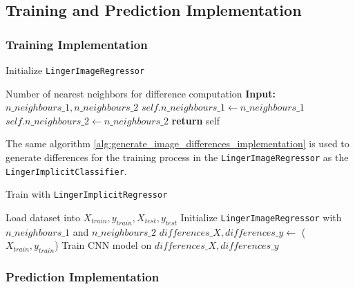 \documentclass[a4paper, 12pt]{report}
\begin{document}
\subsection{Training and Prediction Implementation}
\subsubsection{Training Implementation}
\begin{algorithm}
    \caption{Initialize \texttt{LingerImageRegressor}}
    \label{alg:initialize_regressor}
    \begin{algorithmic}[1]
    \State Number of nearest neighbors for difference computation
    \State \textbf{Input:} $n\_neighbours\_1, n\_neighbours\_2$ 
        \State $self.n\_neighbours\_1 \gets n\_neighbours\_1$
        \State $self.n\_neighbours\_2 \gets n\_neighbours\_2$
        \State \textbf{return} self
    \EndProcedure
    \end{algorithmic}
\end{algorithm}

The same algorithm \ref{alg:generate_image_differences_implementation} is used to generate differences for the training process in the \texttt{LingerImageRegressor} 
as the \texttt{LingerImplicitClassifier}.

\begin{algorithm}
    \caption{Train with \texttt{LingerImplicitRegressor}}
    \label{alg:train_image_reg_train_implementation}
    \begin{algorithmic}[1]
        \State Load dataset into $X_{train}, y_{train}, X_{test}, y_{test}$
        \State Initialize \texttt{LingerImageRegressor} with $n\_neighbours\_1$ and $n\_neighbours\_2$
        \State $differences\_X, differences\_y \gets$ ($X_{train}, y_{train}$)
        \State Train CNN model on $differences\_X, differences\_y$
        \EndProcedure
    \end{algorithmic}
\end{algorithm}
\clearpage

\subsubsection{Prediction Implementation}
\end{document}
